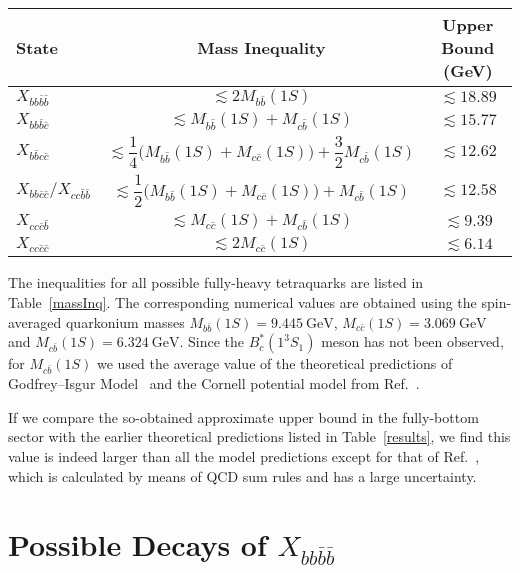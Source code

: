 \documentclass[twocolumn,showpacs,superscriptaddress,preprintnumbers,nofootinbib,prd]{revtex4-1}
\begin{document}
\begin{table*}
  \renewcommand\arraystretch{2}
  \centering
   \begin{tabular}{lcc}
  \hline\hline
  State  & Mass Inequality & Upper Bound (GeV) \\
  \hline
  $X_{bb\bar{b}\bar{b}}$ & $\lesssim 2 M_{b\bar{b}}(1S)  $ & $\lesssim 18.89$ \\
  $X_{bb\bar{b}\bar{c}}$ & $\lesssim M_{b\bar{b}}(1S) + M_{c\bar{b}}(1S)$ & $\lesssim 15.77$ \\
  $X_{b\bar{b}c\bar{c}}$ & $\lesssim \dfrac{1}{4} \bigg(M_{b\bar{b}}(1S)+M_{c\bar{c}}(1S)\bigg)+ \dfrac{3}{2} M_{c\bar{b}}(1S)$ & $\lesssim 12.62$ \\
  $X_{bb\bar{c}\bar{c}}/X_{cc\bar{b}\bar{b}}$ & $\lesssim \dfrac{1}{2} \bigg(M_{b\bar{b}}(1S)+M_{c\bar{c}}(1S)\bigg)+M_{c\bar{b}}(1S)$ & $\lesssim 12.58$ \\
  $X_{cc\bar{c}\bar{b}}$ & $\lesssim M_{c\bar{c}}(1S) + M_{c\bar{b}}(1S)$ & $\lesssim 9.39$ \\
  $X_{cc\bar{c}\bar{c}}$ & $\lesssim 2 M_{c\bar{c}}(1S)  $ & $\lesssim 6.14 $ \\
  \hline\hline
\end{tabular}
\caption{Mass inequality relations and upper bounds of the mass of ground-state fully-heavy tetraquarks formed of bottom and charm quarks.}
\label{massInq}
\end{table*}


The inequalities for all possible fully-heavy tetraquarks are listed in  Table~\ref{massInq}. The corresponding numerical values are obtained using the spin-averaged quarkonium masses $M_{b\bar{b}}(1S)=9.445~\text{GeV}$, $M_{c\bar{c}}(1S)= 3.069~\text{GeV}$ and $M_{c\bar{b}}(1S)= 6.324~\text{GeV}$. Since the $B_{c}^* (1 ^3S_1)$ meson has not been observed, for $M_{c\bar{b}}(1S)$ we used the average value of the theoretical predictions of
Godfrey--Isgur Model~\cite{Godfrey:2004ya} and the Cornell potential model
from Ref.~\cite{Eichten:1994gt}.

If we compare the so-obtained approximate upper bound in the fully-bottom sector with the
earlier theoretical predictions listed in Table~\ref{results}, we find this
value is indeed larger than all the model predictions except for that of
Ref.~\cite{Wang:2017jtz}, which is calculated by means of QCD sum rules and has a large
uncertainty.



\section{Possible Decays of $X_{bb\bar{b}\bar{b}}$}
\label{decays}
\end{document}
